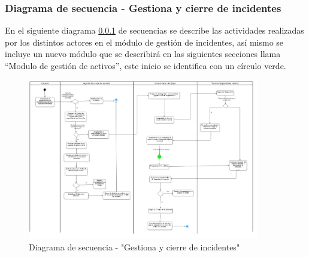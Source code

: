 \subsubsection{Diagrama de secuencia - Gestiona y cierre de incidentes}




En el siguiente diagrama \ref{} de secuencias se describe las actividades realizadas por los distintos actores en el módulo de gestión de incidentes, así mismo se incluye un nuevo módulo que se describirá en las siguientes secciones llama “Modulo de gestión de activos”, este inicio se identifica con un círculo verde. 


\begin{figure}[H]
	\centering
	\includegraphics[width=0.9\textwidth]{Capitulo4/Img/GestionInc/GestionINC}
	\caption{Diagrama de secuencia - "Gestiona y cierre de incidentes"}
	\label{fig:DSLDI}
\end{figure}

